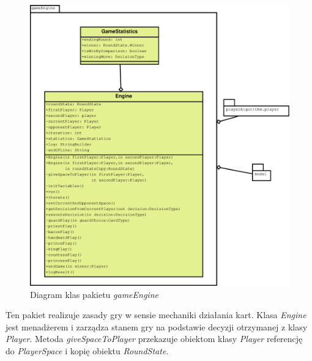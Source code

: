 \begin{figure}[H]
	\centering
	\includegraphics[width=\textwidth]{Resources/diagramKlas_engine.eps}
	\caption{Diagram klas pakietu \textit{gameEngine}} 
	\label{fig:diagramKlasEngine}
\end{figure}
Ten pakiet realizuje zasady gry w sensie mechaniki działania kart. Klasa \textit{Engine} jest menadżerem i zarządza stanem gry na podstawie decyzji otrzymanej z klasy \textit{Player}. Metoda \textit{giveSpaceToPlayer} przekazuje obiektom klasy \textit{Player} referencję do \textit{PlayerSpace} i kopię obiektu \textit{RoundState}. 


